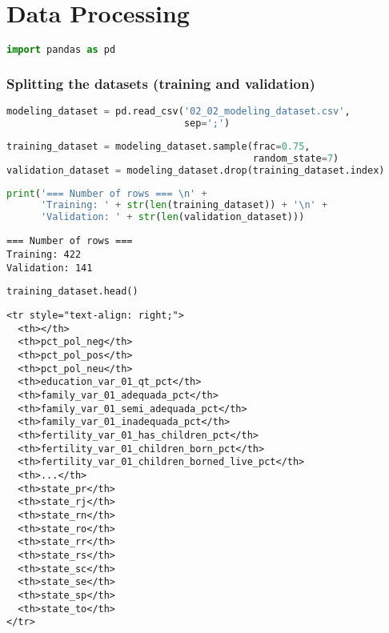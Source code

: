 \section{Data Processing}\label{data-processing}

\begin{lstlisting}[language=Python]
import pandas as pd
\end{lstlisting}

\subsubsection{Splitting the datasets (training and
validation)}\label{splitting-the-datasets-training-and-validation}

\begin{lstlisting}[language=Python]
modeling_dataset = pd.read_csv('02_02_modeling_dataset.csv',
                               sep=';')
\end{lstlisting}

\begin{lstlisting}[language=Python]
training_dataset = modeling_dataset.sample(frac=0.75,
                                           random_state=7)
validation_dataset = modeling_dataset.drop(training_dataset.index)
\end{lstlisting}

\begin{lstlisting}[language=Python]
print('=== Number of rows === \n' +
      'Training: ' + str(len(training_dataset)) + '\n' +
      'Validation: ' + str(len(validation_dataset)))
\end{lstlisting}

\begin{lstlisting}
=== Number of rows === 
Training: 422
Validation: 141
\end{lstlisting}

\begin{lstlisting}[language=Python]
training_dataset.head()
\end{lstlisting}

\begin{lstlisting}
<tr style="text-align: right;">
  <th></th>
  <th>pct_pol_neg</th>
  <th>pct_pol_pos</th>
  <th>pct_pol_neu</th>
  <th>education_var_01_qt_pct</th>
  <th>family_var_01_adequada_pct</th>
  <th>family_var_01_semi_adequada_pct</th>
  <th>family_var_01_inadequada_pct</th>
  <th>fertility_var_01_has_children_pct</th>
  <th>fertility_var_01_children_born_pct</th>
  <th>fertility_var_01_children_borned_live_pct</th>
  <th>...</th>
  <th>state_pr</th>
  <th>state_rj</th>
  <th>state_rn</th>
  <th>state_ro</th>
  <th>state_rr</th>
  <th>state_rs</th>
  <th>state_sc</th>
  <th>state_se</th>
  <th>state_sp</th>
  <th>state_to</th>
</tr>
\end{lstlisting}

